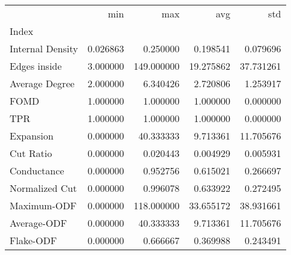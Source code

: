 \begin{tabular}{lrrrr}
\toprule
{} &       min &         max &        avg &        std \\
Index            &           &             &            &            \\
\midrule
Internal Density &  0.026863 &    0.250000 &   0.198541 &   0.079696 \\
Edges inside     &  3.000000 &  149.000000 &  19.275862 &  37.731261 \\
Average Degree   &  2.000000 &    6.340426 &   2.720806 &   1.253917 \\
FOMD             &  1.000000 &    1.000000 &   1.000000 &   0.000000 \\
TPR              &  1.000000 &    1.000000 &   1.000000 &   0.000000 \\
Expansion        &  0.000000 &   40.333333 &   9.713361 &  11.705676 \\
Cut Ratio        &  0.000000 &    0.020443 &   0.004929 &   0.005931 \\
Conductance      &  0.000000 &    0.952756 &   0.615021 &   0.266697 \\
Normalized Cut   &  0.000000 &    0.996078 &   0.633922 &   0.272495 \\
Maximum-ODF      &  0.000000 &  118.000000 &  33.655172 &  38.931661 \\
Average-ODF      &  0.000000 &   40.333333 &   9.713361 &  11.705676 \\
Flake-ODF        &  0.000000 &    0.666667 &   0.369988 &   0.243491 \\
\bottomrule
\end{tabular}
